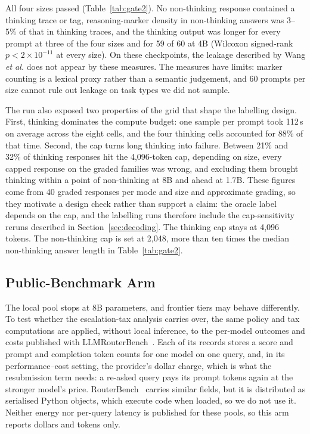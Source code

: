 All four sizes passed (Table~\ref{tab:gate2}). No non-thinking response
contained a thinking trace or tag, reasoning-marker density in non-thinking
answers was 3--5\% of that in thinking traces, and the thinking output was
longer for every prompt at three of the four sizes and for 59 of 60 at 4B
(Wilcoxon signed-rank $p < 2 \times 10^{-11}$ at every size). On these
checkpoints, the leakage described by Wang \emph{et al.} does not appear by
these measures. The measures have limits: marker counting is a lexical proxy
rather than a semantic judgement, and 60 prompts per size cannot rule out
leakage on task types we did not sample.

The run also exposed two properties of the grid that shape the labelling
design. First, thinking dominates the compute budget: one sample per prompt
took 112\,s on average across the eight cells, and the four thinking cells
accounted for 88\% of that time. Second, the cap turns long thinking into
failure. Between 21\% and 32\% of thinking responses hit the 4{,}096-token
cap, depending on size, every capped response on the graded families was
wrong, and excluding them brought thinking within a point of non-thinking at
8B and ahead at 1.7B. These figures come from 40 graded responses per mode
and size and approximate grading, so they motivate a design check rather
than support a claim: the oracle label depends on the cap, and the labelling
runs therefore include the cap-sensitivity reruns described in
Section~\ref{sec:decoding}. The thinking cap stays at 4{,}096 tokens. The
non-thinking cap is set at 2{,}048, more than ten times the median
non-thinking answer length in Table~\ref{tab:gate2}.

\subsection{Public-Benchmark Arm}
\label{sec:public-arm}

The local pool stops at 8B parameters, and frontier tiers may behave
differently. To test whether the escalation-tax analysis carries over, the
same policy and tax computations are applied, without local inference, to
the per-model outcomes and costs published with
LLMRouterBench~\cite{li2026llmrouterbench}. Each of its records stores a
score and prompt and completion token counts for one model on one query,
and, in its performance--cost setting, the provider's dollar charge, which
is what the resubmission term needs: a re-asked query pays its prompt
tokens again at the stronger model's price.
RouterBench~\cite{hu2024routerbench} carries similar fields, but it is
distributed as serialised Python objects, which execute code when loaded,
so we do not use it. Neither energy nor per-query latency is published for
these pools, so this arm reports dollars and tokens only.

